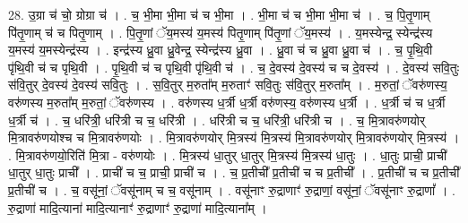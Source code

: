 \documentclass[17pt]{extarticle}
\begin{document}
28. उ॒ग्रा च॑ चो॒ ग्रोग्रा च॑ । . च॒ भी॒मा भी॒मा च॑ च भी॒मा । . भी॒मा च॑ च भी॒मा भी॒मा च॑ । . च॒ पि॒तृ॒णाम् पि॑तृ॒णाम् च॑ च पितृ॒णाम् । . पि॒तृ॒णां ॅय॒मस्य॑ य॒मस्य॑ पितृ॒णाम् पि॑तृ॒णां ॅय॒मस्य॑ । . य॒मस्येन्द्र॒ स्येन्द्र॑स्य य॒मस्य॑ य॒मस्येन्द्र॑स्य । . इन्द्र॑स्य ध्रु॒वा ध्रु॒वेन्द्र॒ स्येन्द्र॑स्य ध्रु॒वा । . ध्रु॒वा च॑ च ध्रु॒वा ध्रु॒वा च॑ । . च॒ पृ॒थि॒वी पृ॑थि॒वी च॑ च पृथि॒वी । . पृ॒थि॒वी च॑ च पृथि॒वी पृ॑थि॒वी च॑ । . च॒ दे॒वस्य॑ दे॒वस्य॑ च च दे॒वस्य॑ । . दे॒वस्य॑ सवि॒तुः स॑वि॒तुर् दे॒वस्य॑ दे॒वस्य॑ सवि॒तुः । . स॒वि॒तुर् म॒रुता᳚म् म॒रुताꣳ॑ सवि॒तुः स॑वि॒तुर् म॒रुता᳚म् । . म॒रुतां॒ ॅवरु॑णस्य॒ वरु॑णस्य म॒रुता᳚म् म॒रुतां॒ ॅवरु॑णस्य । . वरु॑णस्य ध॒र्त्री ध॒र्त्री वरु॑णस्य॒ वरु॑णस्य ध॒र्त्री । . ध॒र्त्री च॑ च ध॒र्त्री ध॒र्त्री च॑ । . च॒ धरि॑त्री॒ धरि॑त्री च च॒ धरि॑त्री । . धरि॑त्री च च॒ धरि॑त्री॒ धरि॑त्री च । . च॒ मि॒त्रावरु॑णयोर् मि॒त्रावरु॑णयोश्च च मि॒त्रावरु॑णयोः । . मि॒त्रावरु॑णयोर् मि॒त्रस्य॑ मि॒त्रस्य॑ मि॒त्रावरु॑णयोर् मि॒त्रावरु॑णयोर् मि॒त्रस्य॑ । . मि॒त्रावरु॑णयो॒रिति॑ मि॒त्रा - वरु॑णयोः । . मि॒त्रस्य॑ धा॒तुर् धा॒तुर् मि॒त्रस्य॑ मि॒त्रस्य॑ धा॒तुः । . धा॒तुः प्राची॒ प्राची॑ धा॒तुर् धा॒तुः प्राची᳚ । . प्राची॑ च च॒ प्राची॒ प्राची॑ च । . च॒ प्र॒तीची᳚ प्र॒तीची॑ च च प्र॒तीची᳚ । . प्र॒तीची॑ च च प्र॒तीची᳚ प्र॒तीची॑ च । . च॒ वसू॑नां॒ ॅवसू॑नाम् च च॒ वसू॑नाम् । . वसू॑नाꣳ रु॒द्राणाꣳ॑ रु॒द्राणां॒ वसू॑नां॒ ॅवसू॑नाꣳ रु॒द्राणां᳚ । . रु॒द्राणा॑ मादि॒त्याना॑ मादि॒त्यानाꣳ॑ रु॒द्राणाꣳ॑ रु॒द्राणा॑ मादि॒त्याना᳚म् । \newline
\end{document}
